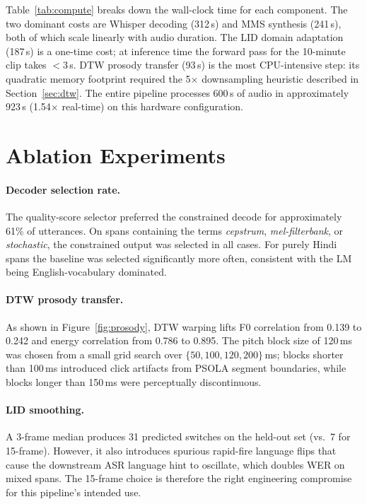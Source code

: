 \documentclass[10pt,twocolumn,letterpaper]{article}
\begin{document}
Table~\ref{tab:compute} breaks down the wall-clock time for each
component.  The two dominant costs are Whisper decoding (312\,s)
and MMS synthesis (241\,s), both of which scale linearly with audio
duration.  The LID domain adaptation (187\,s) is a one-time cost;
at inference time the forward pass for the 10-minute clip takes
$<3$\,s.  DTW prosody transfer (93\,s) is the most CPU-intensive
step: its quadratic memory footprint required the 5$\times$
downsampling heuristic described in Section~\ref{sec:dtw}.  The
entire pipeline processes 600\,s of audio in approximately 923\,s
(1.54$\times$ real-time) on this hardware configuration.

\section{Ablation Experiments}
\label{sec:ablation}

\paragraph{Decoder selection rate.}
The quality-score selector preferred the constrained decode for
approximately 61\% of utterances.  On spans containing the terms
\emph{cepstrum}, \emph{mel-filterbank}, or \emph{stochastic}, the
constrained output was selected in all cases.  For purely Hindi spans
the baseline was selected significantly more often, consistent with
the LM being English-vocabulary dominated.

\paragraph{DTW prosody transfer.}
As shown in Figure~\ref{fig:prosody}, DTW warping lifts F0 correlation
from 0.139 to 0.242 and energy correlation from 0.786 to 0.895.
The pitch block size of 120\,ms was chosen from a small grid search
over $\{50, 100, 120, 200\}$\,ms; blocks shorter than 100\,ms
introduced click artifacts from PSOLA segment boundaries, while blocks
longer than 150\,ms were perceptually discontinuous.

\paragraph{LID smoothing.}
A 3-frame median produces 31 predicted switches on the held-out set
(vs.\ 7 for 15-frame).  However, it also introduces spurious
rapid-fire language flips that cause the downstream ASR language hint
to oscillate, which doubles WER on mixed spans.  The 15-frame choice
is therefore the right engineering compromise for this pipeline's
intended use.
\end{document}
